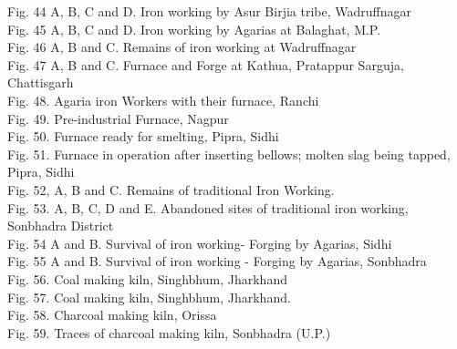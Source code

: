 \begin{myquote}
Fig. 44 A, B, C and D. Iron working by Asur Birjia tribe, Wadruffnagar \\[.2cm]
Fig. 45 A, B, C and D. Iron working by Agarias at Balaghat, M.P.\\[.2cm]
Fig. 46 A, B and C. Remains of iron working at Wadruffnagar \\[.2cm]
Fig. 47 A, B and C.  Furnace and Forge at Kathua, Pratappur Sarguja, Chattisgarh \\[.2cm]
Fig. 48. Agaria iron Workers with their furnace, Ranchi\\[.2cm]
Fig. 49.  Pre-industrial Furnace, Nagpur \\[.2cm]
Fig. 50. Furnace ready for smelting, Pipra, Sidhi\\[.2cm]
Fig. 51. Furnace in operation after inserting bellows; molten slag being tapped, Pipra, Sidhi \\[.2cm]
Fig. 52, A, B and C. Remains of traditional Iron Working. \\[.2cm]
Fig. 53. A, B, C, D and E. Abandoned sites of traditional iron working, Sonbhadra District\\[.2cm]
Fig. 54 A and B. Survival of iron working- Forging by Agarias, Sidhi \\[.2cm]
Fig. 55 A and B. Survival of iron working - Forging by Agarias, Sonbhadra \\[.2cm]
Fig. 56. Coal making kiln, Singhbhum, Jharkhand\\[.2cm]
Fig. 57.  Coal making kiln, Singhbhum, Jharkhand.\\[.2cm]
Fig. 58. Charcoal making kiln, Orissa\\[.2cm]
Fig. 59. Traces of charcoal making kiln, Sonbhadra (U.P.)

\end{myquote}











